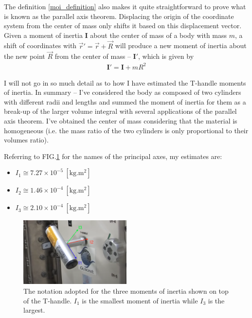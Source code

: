 \documentclass[a4paper]{article}
\begin{document}
	The definition \eqref{moi_definition} also makes it quite straightforward to prove what is known as the parallel axis theorem.
	Displacing the origin of the coordinate system from the center of mass only shifts it based on this displacement vector.
	Given a moment of inertia $\mathbf{I}$ about the center of mass of a body with mass $m$, a shift of coordinates with $\vec{r}' = \vec{r} + \vec{R}$ will produce a new moment of inertia about the new point $\vec{R}$ from the center of mass -- $\mathbf{I}'$, which is given by
	\begin{eqnarray}
		\mathbf{I}' = \mathbf{I} + mR^2
	\end{eqnarray}

	I will not go in so much detail as to how I have estimated the T-handle moments of inertia.
	In summary -- I've considered the body as composed of two cylinders with different radii and lengths and summed the moment of inertia for them as a break-up of the larger volume integral with several applications of the parallel axis theorem.
	I've obtained the center of mass considering that the material is homogeneous (i.e. the mass ratio of the two cylinders is only proportional to their volumes ratio).
	
	Referring to FIG.\ref{T_handle_axes} for the names of the principal axes, my estimates are:
	\begin{itemize}
		\item $I_1 \cong 7.27 \times 10^{-5} \ [\mathrm{kg.m^2}]$
		\item $I_2 \cong 1.46 \times 10^{-4} \ [\mathrm{kg.m^2}]$
		\item $I_3 \cong 2.10 \times 10^{-4} \ [\mathrm{kg.m^2}]$
	\end{itemize} 

	\begin{figure}[ht]
		\centering
		\includegraphics[width=0.5\textwidth]{T_handle_axes.png}
		\caption{The notation adopted for the three moments of inertia shown on top of the T-handle. $I_1$ is the smallest moment of inertia while $I_3$ is the largest.}\label{T_handle_axes}
	\end{figure}
	
\end{document}
